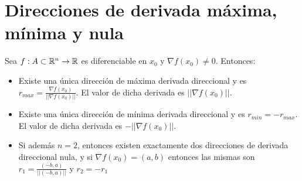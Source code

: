 \section{Direcciones de derivada máxima, mínima y nula}

\begin{proposition}
Sea $ f : A \subset \mathbb{R}^n \to \mathbb{R}$ es diferenciable en $ x_0 $ y $\nabla f(x_0) \neq 0$.  Entonces:

\begin{itemize}
\item Existe una única dirección de máxima derivada direccional y es $r_{max} = \frac{\nabla f(x_0)}{||\nabla f(x_0)||}$.  El valor de dicha derivada es $||\nabla f(x_0)||$.

\item Existe una única dirección de mínima derivada direccional y es $r_{min} = - r_{max}$.  El valor de dicha derivada es $ - ||\nabla f(x_0)||$.

\item Si además $n=2$, entonces existen exactamente dos direcciones de derivada direccional nula, y si $\nabla f(x_0) = (a,b)$ entonces las mismas son $r_1 = \frac{(-b,a)}{||(-b,a)||}$ y $r_2 = - r_1$
\end{itemize}

\end{proposition}

